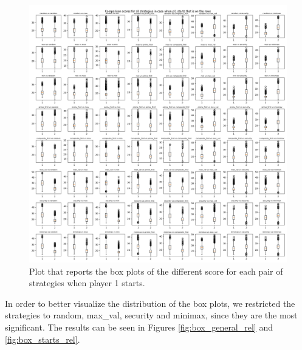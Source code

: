 \begin{figure}
	\centering
	\includegraphics[width=1\linewidth]{img/scores_p1first.png}
	\caption{Plot that reports the box plots of the different score for each pair of strategies when player 1 starts.}
	\label{fig:box_starts}
\end{figure}

In order to better visualize the distribution of the box plots, we restricted the strategies to random, max\_val, security and minimax, since they are the most significant. The results can be seen in Figures \ref{fig:box_general_rel} and \ref{fig:box_starts_rel}.

